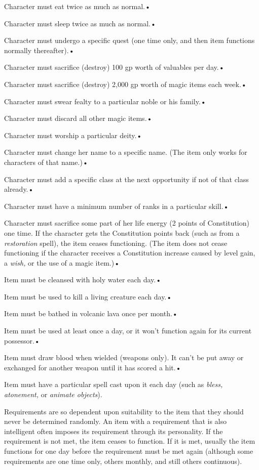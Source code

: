 \documentclass{article}
\begin{document}
\parindent=3pt
Character must eat twice as much as normal.• 

Character must sleep twice as much as normal.• 

\parindent=7pt
Character must undergo a specific quest (one time only, and then item functions 
normally thereafter).• 

\parindent=3pt
Character must sacrifice (destroy) 100 gp worth of valuables per day.• 

Character must sacrifice (destroy) 2,000 gp worth of magic items each week.• 

\parindent=7pt
Character must swear fealty to a particular noble or his family.• 

\parindent=3pt
Character must discard all other magic items.• 

Character must worship a particular deity.• 

\parindent=7pt
Character must change her name to a specific name. (The item only works for characters 
of that name.)• 

\parindent=3pt
Character must add a specific class at the next opportunity if not of that class 
already.• 

Character must have a minimum number of ranks in a particular skill.• 

\parindent=7pt
Character must sacrifice some part of her life energy (2 points of Constitution) 
one time. If the character gets the Constitution points back (such as from a \textit{restoration 
}spell), the item ceases functioning. (The item does not cease functioning if the 
character receives a Constitution increase caused by level gain, a \textit{wish, 
}or the use of a magic item.)• 

\parindent=3pt
Item must be cleansed with holy water each day.• 

Item must be used to kill a living creature each day.• 

\parindent=7pt
Item must be bathed in volcanic lava once per month.• 

\parindent=3pt
Item must be used at least once a day, or it won't function again for its current 
possessor.• 

Item must draw blood when wielded (weapons only). It can't be put away or exchanged 
for another weapon until it has scored a hit.• 

\parindent=7pt
Item must have a particular spell cast upon it each day (such as \textit{bless, 
atonement, }or \textit{animate objects}).

\parindent=0pt
Requirements are so dependent upon suitability to the item that they should never 
be determined randomly. An item with a requirement that is also intelligent often 
imposes its requirement through its personality. If the requirement is not met, 
the item ceases to function. If it is met, usually the item functions for one day 
before the requirement must be met again (although some requirements are one time 
only, others monthly, and still others continuous).
\end{document}
